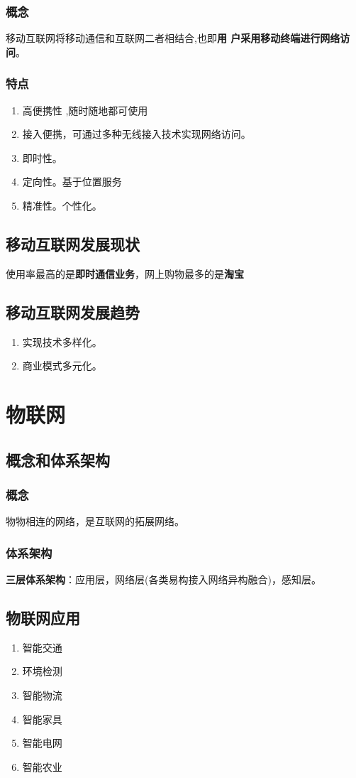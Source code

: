 \documentclass{report}
\begin{document}
	\subsection{概念}
	移动互联网将移动通信和互联网二者相结合,也即\textbf{用
	户采用移动终端进行网络访问}。
	\subsection{特点}
	\begin{enumerate}
		\item 高便携性 ,随时随地都可使用
		\item 接入便携，可通过多种无线接入技术实现网络访问。
		\item 即时性。
		\item 定向性。基于位置服务
		\item 精准性。个性化。
		
	\end{enumerate}
	\section{移动互联网发展现状}
	使用率最高的是\textbf{即时通信业务}，网上购物最多的是\textbf{淘宝}
	\section{移动互联网发展趋势}
	\begin{enumerate}
		\item 实现技术多样化。
		\item 商业模式多元化。
	\end{enumerate}
	
	\chapter{物联网}
	\section{概念和体系架构}
	\subsection{概念}
	物物相连的网络，是互联网的拓展网络。
	\subsection{体系架构}
	\textbf{三层体系架构}：应用层，网络层(各类易构接入网络异构融合)，感知层。
	\section{物联网应用}
	\begin{enumerate}
		\item 智能交通
		\item 环境检测
		\item 智能物流
		\item 智能家具
		\item 智能电网
		\item 智能农业
	\end{enumerate}
\end{document}
